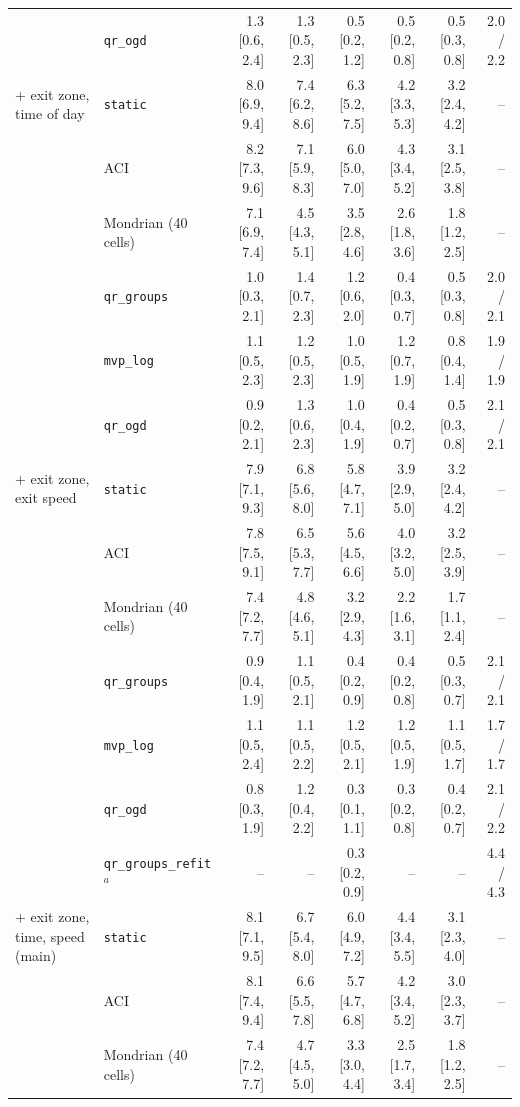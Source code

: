 \begin{tabular}{@{}llrrrrrr@{}}
 & \texttt{qr\_ogd} & 1.3 [0.6, 2.4] & 1.3 [0.5, 2.3] & 0.5 [0.2, 1.2] & 0.5 [0.2, 0.8] & 0.5 [0.3, 0.8] & 2.0 / 2.2 \\
\addlinespace
+ exit zone, time of day & \texttt{static} & 8.0 [6.9, 9.4] & 7.4 [6.2, 8.6] & 6.3 [5.2, 7.5] & 4.2 [3.3, 5.3] & 3.2 [2.4, 4.2] & -- \\
 & ACI & 8.2 [7.3, 9.6] & 7.1 [5.9, 8.3] & 6.0 [5.0, 7.0] & 4.3 [3.4, 5.2] & 3.1 [2.5, 3.8] & -- \\
 & Mondrian (40 cells) & 7.1 [6.9, 7.4] & 4.5 [4.3, 5.1] & 3.5 [2.8, 4.6] & 2.6 [1.8, 3.6] & 1.8 [1.2, 2.5] & -- \\
 & \texttt{qr\_groups} & 1.0 [0.3, 2.1] & 1.4 [0.7, 2.3] & 1.2 [0.6, 2.0] & 0.4 [0.3, 0.7] & 0.5 [0.3, 0.8] & 2.0 / 2.1 \\
 & \texttt{mvp\_log} & 1.1 [0.5, 2.3] & 1.2 [0.5, 2.3] & 1.0 [0.5, 1.9] & 1.2 [0.7, 1.9] & 0.8 [0.4, 1.4] & 1.9 / 1.9 \\
 & \texttt{qr\_ogd} & 0.9 [0.2, 2.1] & 1.3 [0.6, 2.3] & 1.0 [0.4, 1.9] & 0.4 [0.2, 0.7] & 0.5 [0.3, 0.8] & 2.1 / 2.1 \\
\addlinespace
+ exit zone, exit speed & \texttt{static} & 7.9 [7.1, 9.3] & 6.8 [5.6, 8.0] & 5.8 [4.7, 7.1] & 3.9 [2.9, 5.0] & 3.2 [2.4, 4.2] & -- \\
 & ACI & 7.8 [7.5, 9.1] & 6.5 [5.3, 7.7] & 5.6 [4.5, 6.6] & 4.0 [3.2, 5.0] & 3.2 [2.5, 3.9] & -- \\
 & Mondrian (40 cells) & 7.4 [7.2, 7.7] & 4.8 [4.6, 5.1] & 3.2 [2.9, 4.3] & 2.2 [1.6, 3.1] & 1.7 [1.1, 2.4] & -- \\
 & \texttt{qr\_groups} & 0.9 [0.4, 1.9] & 1.1 [0.5, 2.1] & 0.4 [0.2, 0.9] & 0.4 [0.2, 0.8] & 0.5 [0.3, 0.7] & 2.1 / 2.1 \\
 & \texttt{mvp\_log} & 1.1 [0.5, 2.4] & 1.1 [0.5, 2.2] & 1.2 [0.5, 2.1] & 1.2 [0.5, 1.9] & 1.1 [0.5, 1.7] & 1.7 / 1.7 \\
 & \texttt{qr\_ogd} & 0.8 [0.3, 1.9] & 1.2 [0.4, 2.2] & 0.3 [0.1, 1.1] & 0.3 [0.2, 0.8] & 0.4 [0.2, 0.7] & 2.1 / 2.2 \\
 & \texttt{qr\_groups\_refit}$^{a}$ & -- & -- & 0.3 [0.2, 0.9] & -- & -- & 4.4 / 4.3 \\
\addlinespace
+ exit zone, time, speed (main) & \texttt{static} & 8.1 [7.1, 9.5] & 6.7 [5.4, 8.0] & 6.0 [4.9, 7.2] & 4.4 [3.4, 5.5] & 3.1 [2.3, 4.0] & -- \\
 & ACI & 8.1 [7.4, 9.4] & 6.6 [5.5, 7.8] & 5.7 [4.7, 6.8] & 4.2 [3.4, 5.2] & 3.0 [2.3, 3.7] & -- \\
 & Mondrian (40 cells) & 7.4 [7.2, 7.7] & 4.7 [4.5, 5.0] & 3.3 [3.0, 4.4] & 2.5 [1.7, 3.4] & 1.8 [1.2, 2.5] & -- \\

\end{tabular}
